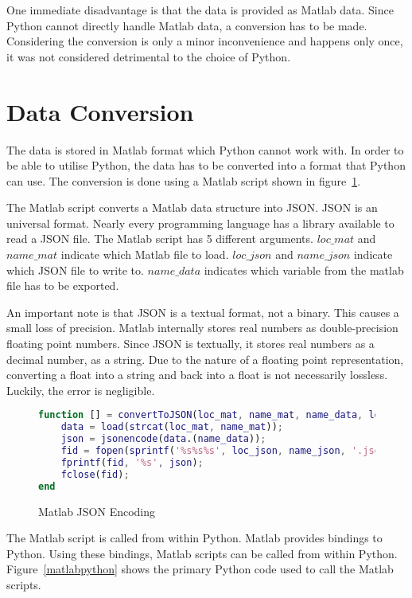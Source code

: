 One immediate disadvantage is that the data is provided as Matlab data. Since Python cannot directly handle Matlab data, a conversion has to be made. Considering the conversion is only a minor inconvenience and happens only once, it was not considered detrimental to the choice of Python.

\section{Data Conversion}

The data is stored in Matlab format which Python cannot work with. In order to be able to utilise Python, the data has to be converted into a format that Python can use. The conversion is done using a Matlab script shown in figure~\ref{matlabjson}. 

The Matlab script converts a Matlab data structure into JSON. JSON is an universal format. Nearly every programming language has a library available to read a JSON file. The Matlab script has 5 different arguments. $loc\_mat$ and $name\_mat$ indicate which Matlab file to load. $loc\_json$ and $name\_json$ indicate which JSON file to write to. $name\_data$ indicates which variable from the matlab file has to be exported.

An important note is that JSON is a textual format, not a binary. This causes a small loss of precision. Matlab internally stores real numbers as double-precision floating point numbers. Since JSON is textually, it stores real numbers as a decimal number, as a string. Due to the nature of a floating point representation, converting a float into a string and back into a float is not necessarily lossless. Luckily, the error is negligible.  

\begin{figure}[H]
\caption{Matlab JSON Encoding}
\label{matlabjson}
\begin{lstlisting}[language=Matlab]
function [] = convertToJSON(loc_mat, name_mat, name_data, loc_json, name_json)
    data = load(strcat(loc_mat, name_mat));
    json = jsonencode(data.(name_data));
    fid = fopen(sprintf('%s%s%s', loc_json, name_json, '.json'),'wt');
    fprintf(fid, '%s', json);
    fclose(fid);
end
\end{lstlisting}
\end{figure}

The Matlab script is called from within Python. Matlab provides bindings to Python. Using these bindings, Matlab scripts can be called from within Python. Figure~\ref{matlabpython} shows the primary Python code used to call the Matlab scripts. 

